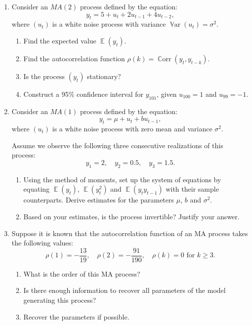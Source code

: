 \documentclass[12pt]{article}
\DeclareMathOperator{\Corr}{\mathbb{C}orr}
\DeclareMathOperator{\Var}{\mathbb{V}ar}
\DeclareMathOperator{\E}{\mathbb{E}}
\begin{document}
\begin{enumerate}
\item Consider an \( MA(2) \) process defined by the equation:
\[
y_t = 5 + u_t + 2u_{t-1} + 4u_{t-2},
\]
where \((u_t)\) is a white noise process with variance \(\Var(u_t) = \sigma^2\).

    \begin{enumerate}
        \item Find the expected value \(\E(y_t)\).
        \item Find the autocorrelation function \(\rho(k) = \Corr(y_t, y_{t-k})\).
        \item Is the process \((y_t)\) stationary?
        \item Construct a 95\% confidence interval for \(y_{101}\), given \(u_{100} = 1\) and \(u_{99} = -1\).
    \end{enumerate}

\item Consider an \( MA(1) \) process defined by the equation:
\[
y_t = \mu + u_t + b u_{t-1},
\]
where \((u_t)\) is a white noise process with zero mean and variance \(\sigma^2\).

Assume we observe the following three consecutive realizations of this process:
\[
y_1 = 2, \quad y_2 = 0.5, \quad y_3 = 1.5.
\]

    \begin{enumerate}
          \item Using the method of moments, set up the system of equations by equating $\E(y_t)$, $\E(y_t^2)$ and $\E(y_t y_{t-1})$ with their sample counterparts.
          Derive estimates for the parameters $\mu$, $b$ and \(\sigma^2\).

        \item Based on your estimates, is the process invertible? Justify your answer.
    \end{enumerate}

\item Suppose it is known that the autocorrelation function of an MA process takes the following values:
\[
\rho(1) = -\frac{13}{19}, \quad \rho(2) = -\frac{91}{190}, \quad \rho(k) = 0 \text{ for } k \ge 3.
\]

 \begin{enumerate}
        \item What is the order of this MA process?
        \item Is there enough information to recover all parameters of the model generating this process?
        \item Recover the parameters if possible.
    \end{enumerate}

\end{enumerate}
\end{document}
